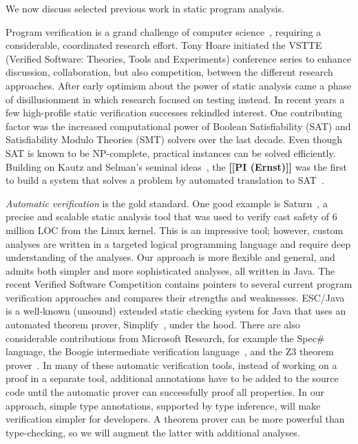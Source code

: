 \documentclass{sig-alternate}
\newcommand{\todo}[1]{{\color{red}\bfseries [[#1]]}}
\begin{document}
\nocite{taintdroid}
\nocite{enckunderstanding}
\nocite{encksemantic}
\nocite{interapp}
\nocite{belong}
\nocite{curbing}
\nocite{enckstudy}
\nocite{redelegation}
\nocite{demystified}
\nocite{appfence}
\nocite{livshitsreflection}
\nocite{pios}
\nocite{pointless}
\nocite{panorama}
\nocite{rifle}

We now discuss selected previous work in 
static program analysis.



Program verification is a grand
challenge of computer science~\cite{Hoare2003}, requiring a considerable, coordinated
research effort.
Tony Hoare initiated the VSTTE (Verified Software: Theories,
Tools and Experiments) conference series to enhance discussion,
collaboration, but also competition, between the different research
approaches.
%
After early optimism about the power of static analysis came a phase
of disillusionment in which research focused on testing instead.
In recent years a few high-profile static verification successes
rekindled interest.
One contributing factor was the increased computational power of
Boolean Satisfiability (SAT) and Satisfiability Modulo Theories (SMT)
solvers over the last decade.
Even though SAT is known to be NP-complete, practical instances can be
solved efficiently.
Building on Kautz and Selman's seminal ideas~\cite{KautzS96,KautzSM96}, the
\todo{PI (Ernst)} was the first to build a system that solves a problem by
automated translation to SAT~\cite{ernst-ijcai97}.


\emph{Automatic verification} is the gold standard.  One good example is
Saturn~\cite{AikenBDDHH2007}, a precise and scalable static analysis
tool that was used to verify cast safety of 6 million LOC from the Linux
kernel.
This is an impressive tool; however, custom analyses are written in a
targeted logical programming language and require deep understanding
of the analyses.
Our approach is more flexible and general, and admits both simpler and more
sophisticated analyses, all written in Java.
%
The recent Verified Software Competition \cite{KlebanovEA11} contains
pointers to several current program verification approaches and
compares their strengths and weaknesses.
ESC/Java \cite{Detlefs-etal98,FlanaganLLNSS02,CokK2004} is a well-known
(unsound) extended static checking system for Java that uses an automated
theorem prover, Simplify~\cite{Nelson80,DetlefsNS2003}, under the hood.
There are also considerable contributions from Microsoft Research, for
example the Spec\# \cite{BarnettEA10,LeinoMueller09a} language,
the Boogie intermediate verification language~\cite{Boogie}, and the
Z3 theorem prover~\cite{Z3}.
In many of these automatic verification tools, instead of working on a
proof in a separate tool, additional annotations have to be added to
the source code until the automatic prover can successfully proof all
properties.
In our approach, simple type annotations, supported by type inference,
will make verification simpler for developers.
A theorem prover can be more powerful than type-checking, so we will
augment the latter with additional analyses.
\end{document}
